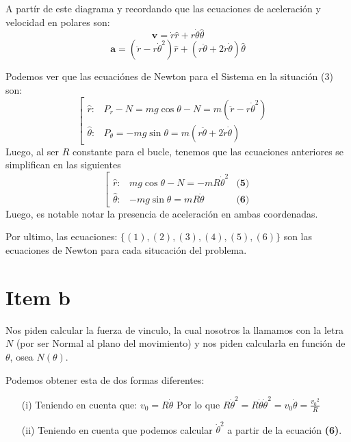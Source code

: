 \documentclass[fleqn,10pt]{SelfArx} %
\begin{document}
A partír de este diagrama y recordando que las ecuaciones de aceleración y velocidad en polares son:
\[\textbf{v} = \dot{r} \hat{r} + r \dot{\theta} \hat{\theta}\]
\[\textbf{a} = (\ddot{r} - r \dot{\theta}^2)\hat{r} + (r \ddot{\theta} + 2 \dot{r} \dot{\theta})\hat{\theta}\]

Podemos ver que las ecuaciónes de Newton para el Sistema en la situación (3) son:
\[\left[ \begin{array}{lll}
 \hat{r}: &P_r - N =   m g \cos{\theta} - N = m (\ddot{r} - r \dot{\theta}^2) & \\
 \hat{\theta}: &P_{\theta} = - m g \sin{\theta}= m (r \ddot{\theta} + 2 \dot{r} \dot{\theta}) & 
\end{array} \right.
\]
Luego, al ser $R$ constante para el bucle, tenemos que las ecuaciones anteriores se simplifican en las siguientes
\[\left[ \begin{array}{lll}
 \hat{r}: &  m g \cos{\theta} - N = - m R \dot{\theta}^2 & \textbf{(5)}\\
 \hat{\theta}: & - m g \sin{\theta}= m R \ddot{\theta} & \textbf{(6)}
\end{array} \right.
\]
Luego, es notable notar la presencia de aceleración en ambas coordenadas.

Por ultimo, las ecuaciones: $\{(1),(2),(3),(4),(5),(6)\}$ son las ecuaciones de Newton para cada situcación del problema.  

\newpage
\section*{Item b}

Nos piden calcular la fuerza de vinculo, la cual nosotros la llamamos con la letra $N$ (por ser Normal al plano del movimiento) y nos piden calcularla en función de $\theta$, osea $N(\theta)$. 

Podemos obtener esta de dos formas diferentes:
\begin{itemize}
\item[(i) ] Teniendo en cuenta que: $v_0 = R \dot{\theta}$ Por lo que 
$R \dot{\theta}^2 = R \dot{\theta} \dot{\theta}^2 = v_0 \dot{\theta} = \frac{{v_0}^2}{R}$

\item[(ii) ] Teniendo en cuenta que podemos calcular $\dot{\theta}^2$ a partir de la ecuación \textbf{(6)}.
\end{itemize}
\end{document}
